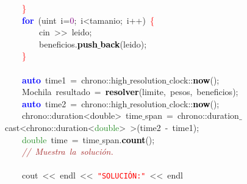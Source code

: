 \mbox{}\ \ \ \ \textcolor{Red}{\}} \\
\mbox{}\ \ \ \ \textbf{\textcolor{Blue}{for}}\ \textcolor{BrickRed}{(}\textcolor{TealBlue}{uint}\ i\textcolor{BrickRed}{=}\textcolor{Purple}{0}\textcolor{BrickRed}{;}\ i\textcolor{BrickRed}{\textless{}}tamanio\textcolor{BrickRed}{;}\ i\textcolor{BrickRed}{++)}\ \textcolor{Red}{\{} \\
\mbox{}\ \ \ \ \ \ \ \ cin\ \textcolor{BrickRed}{\textgreater{}\textgreater{}}\ leido\textcolor{BrickRed}{;} \\
\mbox{}\ \ \ \ \ \ \ \ beneficios\textcolor{BrickRed}{.}\textbf{\textcolor{Black}{push$\_$back}}\textcolor{BrickRed}{(}leido\textcolor{BrickRed}{);} \\
\mbox{}\ \ \ \ \textcolor{Red}{\}} \\
\mbox{} \\
\mbox{}\ \ \ \ \textbf{\textcolor{Blue}{auto}}\ time1\ \textcolor{BrickRed}{=}\ chrono\textcolor{BrickRed}{::}high$\_$resolution$\_$clock\textcolor{BrickRed}{::}\textbf{\textcolor{Black}{now}}\textcolor{BrickRed}{();} \\
\mbox{}\ \ \ \ \textcolor{TealBlue}{Mochila}\ resultado\ \textcolor{BrickRed}{=}\ \textbf{\textcolor{Black}{resolver}}\textcolor{BrickRed}{(}limite\textcolor{BrickRed}{,}\ pesos\textcolor{BrickRed}{,}\ beneficios\textcolor{BrickRed}{);} \\
\mbox{}\ \ \ \ \textbf{\textcolor{Blue}{auto}}\ time2\ \textcolor{BrickRed}{=}\ chrono\textcolor{BrickRed}{::}high$\_$resolution$\_$clock\textcolor{BrickRed}{::}\textbf{\textcolor{Black}{now}}\textcolor{BrickRed}{();} \\
\mbox{}\ \ \ \ chrono\textcolor{BrickRed}{::}\textcolor{TealBlue}{duration\textless{}double\textgreater{}}\ time$\_$span\ \textcolor{BrickRed}{=}\ chrono\textcolor{BrickRed}{::}duration$\_$cast\textcolor{BrickRed}{\textless{}}chrono\textcolor{BrickRed}{::}duration\textcolor{BrickRed}{\textless{}}\textcolor{ForestGreen}{double}\textcolor{BrickRed}{\textgreater{}}\ \textcolor{BrickRed}{\textgreater{}(}time2\ \textcolor{BrickRed}{-}\ time1\textcolor{BrickRed}{);} \\
\mbox{}\ \ \ \ \textcolor{ForestGreen}{double}\ time\ \textcolor{BrickRed}{=}\ time$\_$span\textcolor{BrickRed}{.}\textbf{\textcolor{Black}{count}}\textcolor{BrickRed}{();} \\
\mbox{}\ \ \ \ \textit{\textcolor{Brown}{//\ Muestra\ la\ solución.}} \\
\mbox{} \\
\mbox{}\ \ \ \ cout\ \textcolor{BrickRed}{\textless{}\textless{}}\ endl\ \textcolor{BrickRed}{\textless{}\textless{}}\ \texttt{\textcolor{Red}{"{}SOLUCIÓN:"{}}}\ \textcolor{BrickRed}{\textless{}\textless{}}\ endl \\
